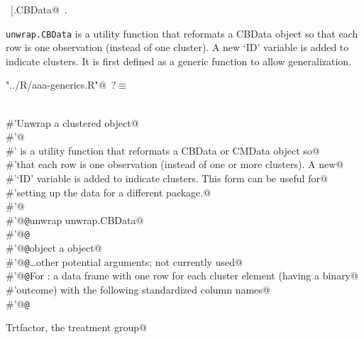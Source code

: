 \documentclass[reqno]{amsart}
\renewcommand{\NWtarget}[2]{\hypertarget{#1}{#2}}
\begin{document}
\begin{flushleft}
\begin{minipage}{\linewidth}
\begin{list}{}{\setlength{\itemsep}{-\parsep}\setlength{\itemindent}{-\leftmargin}}
\item \NWtxtIdentsDefed\nobreak\  \verb@[.CBData@\nobreak\ \NWtxtIdentsNotUsed.
\item{}
\end{list}
\end{minipage}\vspace{4ex}
\end{flushleft}
\texttt{unwrap.CBData} is a utility function that reformats a CBData object so that
each row is one observation (instead of one cluster). A new `ID' variable is added
to indicate clusters. It is first defined as a generic function to allow generalization.

\begin{flushleft} \small\label{scrap8}\raggedright\small
\NWtarget{nuweb?}{} \verb@"../R/aaa-generics.R"@\nobreak\ {\footnotesize {?}}$\equiv$
\vspace{-1ex}
\begin{list}{}{} \item
\mbox{}\verb@@\\
\mbox{}\verb@#'Unwrap a clustered object@\\
\mbox{}\verb@#'@\\
\mbox{}\verb@#' is a utility function that reformats a CBData or CMData object so@\\
\mbox{}\verb@#'that each row is one observation (instead of one or more clusters). A new@\\
\mbox{}\verb@#'`ID' variable is added to indicate clusters. This form can be useful for@\\
\mbox{}\verb@#'setting up the data for a different package.@\\
\mbox{}\verb@#'@\\
\mbox{}\verb@#'@{\tt @}\verb@aliases unwrap unwrap.CBData@\\
\mbox{}\verb@#'@{\tt @}\verb@export@\\
\mbox{}\verb@#'@{\tt @}\verb@param object a  object@\\
\mbox{}\verb@#'@{\tt @}\verb@param \dots other potential arguments; not currently used@\\
\mbox{}\verb@#'@{\tt @}\verb@return For : a data frame with one row for each cluster element (having a binary@\\
\mbox{}\verb@#'outcome) with the following standardized column names@\\
\mbox{}\verb@#'@{\tt @}\verb@return \item{Trt}{factor, the treatment group}@\\

\end{list}
\end{flushleft}
\end{document}
